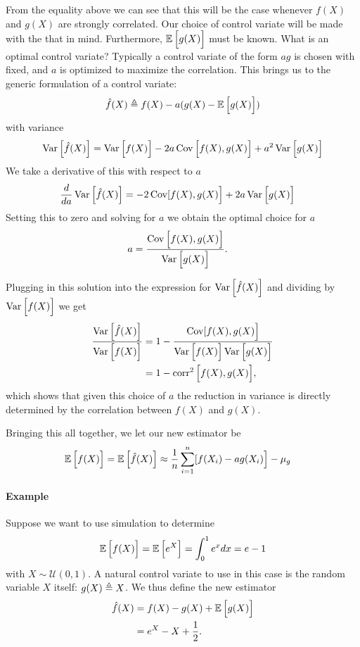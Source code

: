 From the equality above we can see that this will be the case whenever $f(X)$ and $g(X)$ are strongly correlated. Our choice of control variate will be made with the that in mind. Furthermore, $\operatorname{\mathbb{E}} \Big[ g(X) \Big]$ must be known. What is an optimal control variate? Typically a control variate of the form $ag$ is chosen with fixed, and $a$ is optimized to maximize the correlation. This brings us to the generic formulation of a control variate:
\begin{align*}
    \hat{f}(X) \triangleq f(X) - a(g(X) - \operatorname{\mathbb{E}} \Big[ g(X) \Big])
\end{align*}
with variance
\begin{equation*}
  \operatorname{Var} \Big[ \hat{f}(X) \Big] = \operatorname{Var} \Big[ f(X) \Big] - 2a  \operatorname{Cov} \Big[ f(X), g(X) \Big] + a^2 \operatorname{Var} \Big[ g(X) \Big] \\
\end{equation*}
We take a derivative of this with respect to $a$
\begin{align*}
    \frac{d}{d a}\operatorname{Var} \Big[ \hat{f}(X) \Big] &= - 2  \operatorname{Cov} [ f(X), g(X) \Big] + 2a \operatorname{Var} \Big[ g(X) \Big]
\end{align*}
Setting this to zero and solving for $a$ we obtain the optimal choice for $a$
\begin{align}
\label{eq:cv-scale}
  a &= \frac{ \operatorname{Cov} \Big[ f(X), g(X) \Big]}{ \operatorname{Var} \Big[ g(X) \Big]}.
\end{align}

Plugging in this solution into the expression for $\operatorname{Var} \Big[ \hat{f}(X) \Big]$ and dividing by $\operatorname{Var} \Big[ f(X) \Big]$ we get
\begin{align}
\label{eq:var-red}
  \frac{\operatorname{Var} \Big[ \hat{f}(X) \Big]}{\operatorname{Var} \Big[ f(X) \Big]}
    &= 1 - \frac{\operatorname{Cov}[ f(X), g(X) \Big]}{ \operatorname{Var} \Big[ f(X) \Big]  \operatorname{Var} \Big[ g(X) \Big]} \\
    &= 1 - \operatorname{corr}^2 \Big[ f(X), g(X) \Big],
\end{align}
which shows that given this choice of $a$ the reduction in variance is directly determined by the correlation between $f(X)$ and $g(X)$.

Bringing this all together, we let our new estimator be
\begin{align*}
  \operatorname{\mathbb{E}} \Big[ f(X) \Big]
    &= \operatorname{\mathbb{E}} \Big[ \hat{f}(X) \Big] \approx \frac{1}{n} \sum_{i=1}^n [ f(X_i) - ag(X_i) \Big] - \mu_{g}
\end{align*}

\paragraph{Example} \citep{Ross:2006:SIM} Suppose we want to use simulation to determine
\begin{equation*}
    \operatorname{\mathbb{E}} \Big[f(X)\Big] = \operatorname{\mathbb{E}} \Big[e^X\Big] = \int_0^1 e^x dx = e - 1
\end{equation*}
with $X \sim \mathcal{U}(0,1)$. A natural control variate to use in this case is the random variable $X$ itself: $g(X) \triangleq X$. We thus define the new estimator
\begin{align*}
  \hat{f}(X)
    &= f(X) - g(X) + \operatorname{\mathbb{E}} \Big[ g(X) \Big] \\
    &= e^X - X + \frac{1}{2}.
\end{align*}

